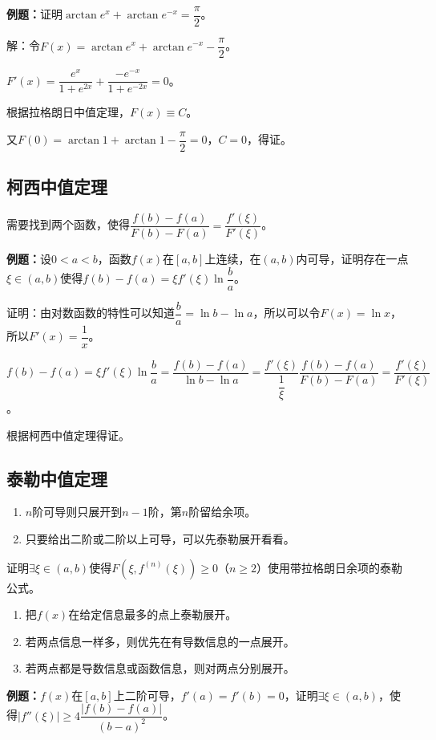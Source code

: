 \documentclass[UTF8, 12pt]{ctexart}
\begin{document}
\textbf{例题：}证明$\arctan e^x+\arctan e^{-x}=\dfrac{\pi}{2}$。

解：令$F(x)=\arctan e^x+\arctan e^{-x}-\dfrac{\pi}{2}$。

$F'(x)=\dfrac{e^x}{1+e^{2x}}+\dfrac{-e^{-x}}{1+e^{-2x}}=0$。

根据拉格朗日中值定理，$F(x)\equiv C$。

又$F(0)=\arctan 1+\arctan 1-\dfrac{\pi}{2}=0$，$C=0$，得证。

\subsection{柯西中值定理}

需要找到两个函数，使得$\dfrac{f(b)-f(a)}{F(b)-F(a)}=\dfrac{f'(\xi)}{F'(\xi)}$。

\textbf{例题：}设$0<a<b$，函数$f(x)$在$[a,b]$上连续，在$(a,b)$内可导，证明存在一点$\xi\in(a,b)$使得$f(b)-f(a)=\xi f'(\xi)\ln\dfrac{b}{a}$。

证明：由对数函数的特性可以知道$\dfrac{b}{a}=\ln b-\ln a$，所以可以令$F(x)=\ln x$，所以$F'(x)=\dfrac{1}{x}$。

$f(b)-f(a)=\xi f'(\xi)\ln\dfrac{b}{a}=\dfrac{f(b)-f(a)}{\ln b-\ln a}=\dfrac{f'(\xi)}{\dfrac{1}{\xi}}\dfrac{f(b)-f(a)}{F(b)-F(a)}=\dfrac{f'(\xi)}{F'(\xi)}$。

根据柯西中值定理得证。

\subsection{泰勒中值定理}

\begin{enumerate}
    \item $n$阶可导则只展开到$n-1$阶，第$n$阶留给余项。
    \item 只要给出二阶或二阶以上可导，可以先泰勒展开看看。
\end{enumerate}

证明$\exists\xi\in(a,b)$使得$F(\xi,f^{(n)}(\xi))\geqslant0$（$n\geqslant2$）使用带拉格朗日余项的泰勒公式。

\begin{enumerate}
    \item 把$f(x)$在给定信息最多的点上泰勒展开。
    \item 若两点信息一样多，则优先在有导数信息的一点展开。
    \item 若两点都是导数信息或函数信息，则对两点分别展开。
\end{enumerate}

\textbf{例题：}$f(x)$在$[a,b]$上二阶可导，$f'(a)=f'(b)=0$，证明$\exists\xi\in(a,b)$，使得$\vert f''(\xi)\vert\geqslant4\dfrac{\vert f(b)-f(a)\vert}{(b-a)^2}$。
\end{document}
